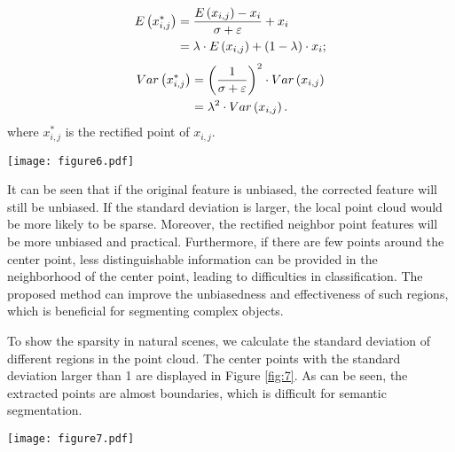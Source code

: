 \documentclass[10pt,twocolumn,letterpaper]{article}
\begin{document}
        \begin{equation}
            \begin{aligned}
        E\left( {x_{i,j}^*} \right) &= {{E\left( {{x_{i,j}}} \right) - {x_i}} \over {\sigma  + \varepsilon }} + {x_i} \\
        &= {\lambda} \cdot E\left( {{x_{i,j}}} \right) + \left( 1-{\lambda} \right) \cdot {x_{i}};
            \end{aligned}
        \end{equation}
        \begin{equation}
            \begin{aligned}
        Var\left( {x_{i,j}^*} \right) &= {\left( {{1 \over {\sigma  + \varepsilon }}} \right)^2} \cdot Var\left( {{x_{i,j}}} \right) \\
        &= {\lambda}^2 \cdot Var\left( {{x_{i,j}}} \right).
            \end{aligned}
        \end{equation}
        where ${x_{i,j}^*}$ is the rectified point of ${x_{i,j}}$.
        \begin{figure*}[!htb]
        \centering
        \texttt{[image: figure6.pdf]}
        \caption{We use the window-normalization method with prior knowledge to calibrate local features. (a) Original expectation by KNN. (b) Calibrated expectation by proposed method}
        \label{fig:6}
        \end{figure*}

        It can be seen that if the original feature is unbiased, the corrected feature will still be unbiased.
        If the standard deviation is larger, the local point cloud would be more likely to be sparse.
        Moreover, the rectified neighbor point features will be more unbiased and practical.
        Furthermore, if there are few points around the center point, less distinguishable information can be provided in the neighborhood of the center point, leading to difficulties in classification.
        The proposed method can improve the unbiasedness and effectiveness of such regions, which is beneficial for segmenting complex objects.

        To show the sparsity in natural scenes, we calculate the standard deviation of different regions in the point cloud.
        The center points with the standard deviation larger than 1 are displayed in Figure \ref{fig:7}.
        As can be seen, the extracted points are almost boundaries, which is difficult for semantic segmentation.
        \begin{figure*}[!htb]
        \centering
        \texttt{[image: figure7.pdf]}
        \caption{The standard deviation of different regions in the point cloud. The center points with the standard deviation of neighbors larger than 1 are displayed. (a) A point cloud with coordinates and RGB features of a scene in S3DIS (Area 5). (b) Points with the standard deviation of neighbors larger than 1.}
        \label{fig:7}
        \end{figure*}
\end{document}
